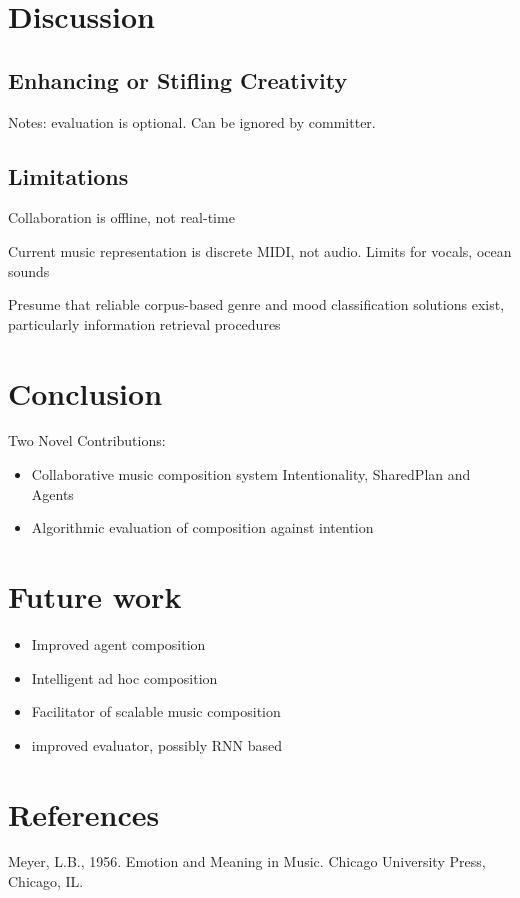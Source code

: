 \documentclass[final,authoryear,11pt,times]{elsarticle}
\begin{document}
\section{Discussion}

\subsection{Enhancing or Stifling Creativity}

Notes: evaluation is optional. Can be ignored by committer.

\subsection{Limitations}

Collaboration is offline, not real-time

Current music representation is discrete MIDI, not audio. Limits for vocals, ocean sounds

Presume that reliable corpus-based genre and mood classification solutions exist, particularly information retrieval procedures



\section{Conclusion}
 Two Novel Contributions:
 \begin{itemize}
\item Collaborative music composition system 
Intentionality, SharedPlan and Agents
\item Algorithmic evaluation of composition against intention
\end{itemize}

\section {Future work}
\begin{itemize}
\item Improved agent composition
\item Intelligent ad hoc composition
\item Facilitator of scalable music composition
\item improved evaluator, possibly RNN based
\end{itemize}

\section{References}
Meyer, L.B., 1956. Emotion and Meaning in Music. Chicago University Press, Chicago, IL.
\end{document}
